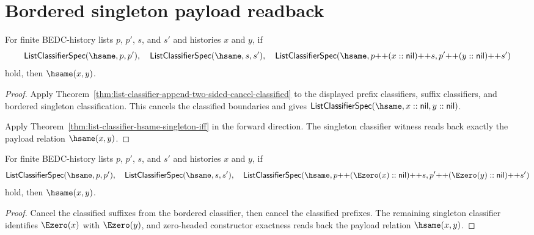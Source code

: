 \section{Bordered singleton payload readback}
\label{sec:list-bordered-singleton-payload-readback}

\begin{theorem}
\label{thm:list-classifier-bordered-singleton-payload-readback}
For finite BEDC-history lists $p$, $p'$, $s$, and $s'$ and histories $x$ and
$y$, if
$$
\mathsf{ListClassifierSpec}(\hsame,p,p'),
\quad
\mathsf{ListClassifierSpec}(\hsame,s,s'),
\quad
\mathsf{ListClassifierSpec}(\hsame,p{++}(x::\mathsf{nil}){++}s,
p'{++}(y::\mathsf{nil}){++}s')
$$
hold, then $\hsame(x,y)$.
\end{theorem}
\begin{proof}
Apply Theorem~\ref{thm:list-classifier-append-two-sided-cancel-classified} to
the displayed prefix classifiers, suffix classifiers, and bordered singleton
classification. This cancels the classified boundaries and gives
$\mathsf{ListClassifierSpec}(\hsame,x::\mathsf{nil},y::\mathsf{nil})$.

Apply Theorem~\ref{thm:list-classifier-hsame-singleton-iff} in the forward
direction. The singleton classifier witness reads back exactly the payload
relation $\hsame(x,y)$.
\end{proof}

\begin{theorem}
\label{thm:list-classifier-bordered-e0-singleton-payload-readback}
For finite BEDC-history lists $p$, $p'$, $s$, and $s'$ and histories $x$ and
$y$, if
$$
\mathsf{ListClassifierSpec}(\hsame,p,p'),
\quad
\mathsf{ListClassifierSpec}(\hsame,s,s'),
\quad
\mathsf{ListClassifierSpec}(\hsame,p{++}(\Ezero(x)::\mathsf{nil}){++}s,
p'{++}(\Ezero(y)::\mathsf{nil}){++}s')
$$
hold, then $\hsame(x,y)$.
\end{theorem}
\begin{proof}
Cancel the classified suffixes from the bordered classifier, then cancel the
classified prefixes. The remaining singleton classifier identifies
$\Ezero(x)$ with $\Ezero(y)$, and zero-headed constructor exactness reads back
the payload relation $\hsame(x,y)$.
\end{proof}

